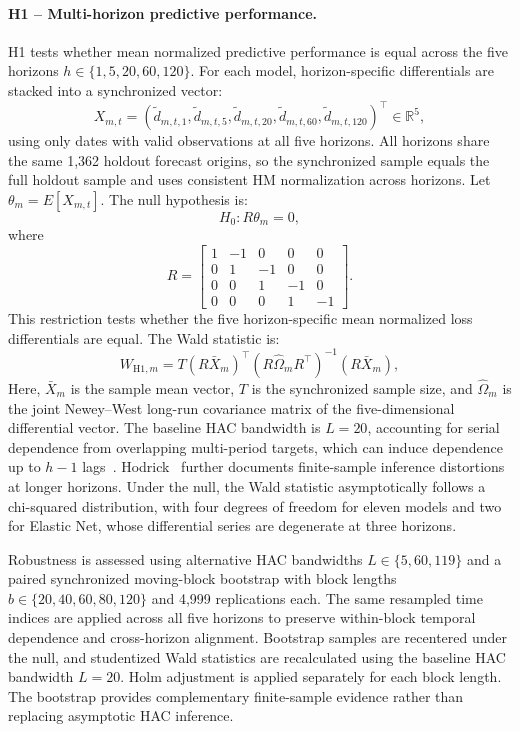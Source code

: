\documentclass[runningheads,orivec]{llncs}
\begin{document}
\paragraph{H1 -- Multi-horizon predictive performance.} H1 tests whether mean normalized predictive performance is equal across the five horizons $h\in\{1,5,20,60,120\}$. For each model, horizon-specific differentials are stacked into a synchronized vector:
\[
X_{m,t}
=
\left(
\widetilde d_{m,t,1},
\widetilde d_{m,t,5},
\widetilde d_{m,t,20},
\widetilde d_{m,t,60},
\widetilde d_{m,t,120}
\right)^\top
\in\mathbb{R}^5,
\]
using only dates with valid observations at all five horizons. All horizons share the same 1,362 holdout forecast origins, so the synchronized sample equals the full holdout sample and uses consistent HM normalization across horizons. Let $\theta_m=E[X_{m,t}]$. The null hypothesis is:
\begin{equation}
H_0:R\theta_m=0,
\end{equation}
where
\begin{equation}
R=
\begin{bmatrix}
1&-1&0&0&0\\
0&1&-1&0&0\\
0&0&1&-1&0\\
0&0&0&1&-1
\end{bmatrix}.
\end{equation}
This restriction tests whether the five horizon-specific mean normalized loss differentials are equal. The Wald statistic is:
\begin{equation}
W_{\mathrm{H1},m}
=
T(R\bar X_m)^\top
\left(R\widehat\Omega_mR^\top\right)^{-1}
(R\bar X_m),
\end{equation}
Here, $\bar X_m$ is the sample mean vector, $T$ is the synchronized sample size, and $\widehat\Omega_m$ is the joint Newey--West long-run covariance matrix of the five-dimensional differential vector. The baseline HAC bandwidth is $L=20$, accounting for serial dependence from overlapping multi-period targets, which can induce dependence up to $h-1$ lags~\cite{hansen1980}. Hodrick~\cite{hodrick1992} further documents finite-sample inference distortions at longer horizons. Under the null, the Wald statistic asymptotically follows a chi-squared distribution, with four degrees of freedom for eleven models and two for Elastic Net, whose differential series are degenerate at three horizons.

Robustness is assessed using alternative HAC bandwidths $L\in\{5,60,119\}$ and a paired synchronized moving-block bootstrap with block lengths $b\in\{20,40,60,80,120\}$ and 4,999 replications each. The same resampled time indices are applied across all five horizons to preserve within-block temporal dependence and cross-horizon alignment. Bootstrap samples are recentered under the null, and studentized Wald statistics are recalculated using the baseline HAC bandwidth $L=20$. Holm adjustment is applied separately for each block length. The bootstrap provides complementary finite-sample evidence rather than replacing asymptotic HAC inference.
\end{document}

